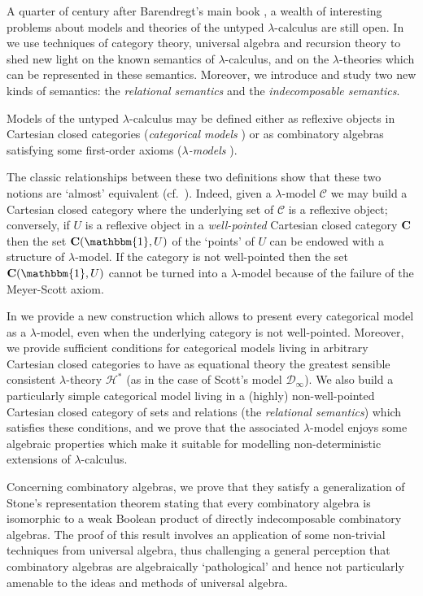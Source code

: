 \documentclass[english]{llncs}
\renewcommand{\bold}[1]{{\bf #1}}
\newcommand{\cat}[1]{\bold{#1}}
\newcommand{\Termobj}{\mathbbm{1}}
\newcommand{\lm}[1]{\mathscr{#1}} \newcommand{\Lint}[1]{\Lbrack #1\Rbrack} \newcommand{\ca}[1]{\mathscr{#1}} \newcommand{\Int}[1]{\vert #1\vert}
\newcommand{\ro}[1]{\mathscr{#1}} \newcommand{\App}{\mathcal{A}}
\newcommand{\gl}{\lambda}
\begin{document}
A quarter of century after Barendregt's main book \cite{Bare}, a wealth of interesting problems about models and theories of the untyped $\lambda$-calculus are still open.
In \cite{ManzonettoTh} we use techniques of category theory, universal algebra and recursion theory to shed new light on the known semantics of $\lambda$-calculus,
and on the $\lambda$-theories which can be represented in these semantics. 
Moreover, we introduce and study two new kinds of semantics: the \emph{relational semantics} and the \emph{in\-de\-com\-po\-sable semantics}.

Models of the untyped $\lambda$-calculus may be defined either as reflexive objects in Cartesian closed categories ({\em categorical models} \cite[Sec.~5.5]{Bare})
or as combinatory algebras satisfying some first-order axioms ({\em $\lambda$-models} \cite[Sec.~5.2]{Bare}).

The classic relationships between these two definitions show that these two notions are `almost' equivalent (cf.\  \cite[Ch.~5]{Bare}).
Indeed, given a $\lambda$-model $\ro{C}$ we may build a Cartesian closed category where the underlying set of  $\ro{C}$ is a reflexive object;
conversely, if $U$  is a reflexive object in a {\em well-pointed} Cartesian closed category $\cat C$ then the set $\cat C(\Termobj,U)$ of the `points' of $U$ can be endowed with a structure of $\lambda$-model.
If the category is not well-pointed then the set $\cat C(\Termobj,U)$ cannot be turned into a $\lambda$-model because of the failure of the Meyer-Scott axiom.

In \cite{ManzonettoTh} we provide a new construction which allows to present every categorical model as a $\lambda$-model, even when the underlying category is not well-pointed.
Moreover, we provide sufficient conditions for categorical models living in arbitrary Cartesian closed categories to have as equational theory the greatest sensible consistent $\gl$-theory $\mathcal{H}^*$ (as in the case of Scott's model $\lm{D}_\infty$).
We also build a particularly simple categorical model living in a (highly) non-well-pointed Cartesian closed category of sets and relations (the {\em relational semantics}) 
which satisfies these conditions, and we prove that the associated $\lambda$-model enjoys some algebraic properties which make it suitable for modelling 
non-deterministic extensions of $\lambda$-calculus.

Concerning combinatory algebras, we prove that they satisfy a generalization of Stone's representation theorem stating that every combinatory algebra is 
isomorphic to a weak Boolean product of directly indecomposable combinatory algebras.
The proof of this result involves an application of some non-trivial techniques from universal algebra, thus challenging a general perception that combinatory algebras are 
algebraically `pathological' and hence not particularly amenable to the ideas and methods of universal algebra.
\end{document}
